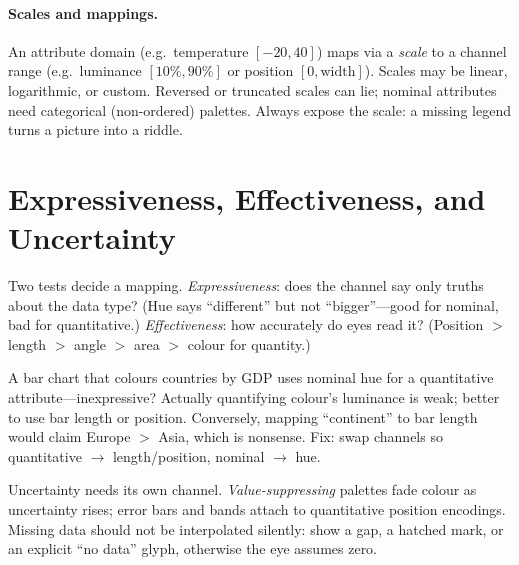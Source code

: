 \paragraph{Scales and mappings.} An attribute domain (e.g.\ temperature $[-20,40]$) maps via a \emph{scale} to a channel range (e.g.\ luminance $[10\%,90\%]$ or position $[0,\text{width}]$). Scales may be linear, logarithmic, or custom. Reversed or truncated scales can lie; nominal attributes need categorical (non-ordered) palettes. Always expose the scale: a missing legend turns a picture into a riddle.

\section{Expressiveness, Effectiveness, and Uncertainty}
\label{sec:express-effective}
Two tests decide a mapping. \emph{Expressiveness}: does the channel say only truths about the data type? (Hue says ``different'' but not ``bigger''---good for nominal, bad for quantitative.) \emph{Effectiveness}: how accurately do eyes read it? (Position $>$ length $>$ angle $>$ area $>$ colour for quantity.)

\begin{example}\label{ex:mismatch}
A bar chart that colours countries by GDP uses nominal hue for a quantitative attribute---inexpressive? Actually quantifying colour's luminance is weak; better to use bar length or position. Conversely, mapping ``continent'' to bar length would claim Europe $>$ Asia, which is nonsense. Fix: swap channels so quantitative $\to$ length/position, nominal $\to$ hue.
\end{example}

Uncertainty needs its own channel. \emph{Value-suppressing} palettes fade colour as uncertainty rises; error bars and bands attach to quantitative position encodings. Missing data should not be interpolated silently: show a gap, a hatched mark, or an explicit ``no data'' glyph, otherwise the eye assumes zero.

